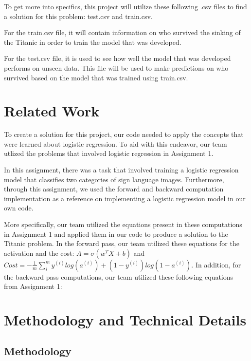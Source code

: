 \documentclass{IEEE}
\begin{document}
To get more into specifics, this project will utilize these following .csv files to find a solution for this problem: test.csv and train.csv.


For the train.csv file, it will contain information on who survived the sinking of the Titanic in order to train the model that was developed.

For the test.csv file, it is used to see how well the model that was developed performs on unseen data. This file will be used to make predictions on who survived based on the model that was trained using train.csv.




\section{Related Work}

To create a solution for this project, our code needed to apply the concepts that were learned about logistic regression. To aid with this endeavor, our team utlized the problems that involved logistic regression in Assignment 1.

In this assignment, there was a task that involved training a logistic regression model that classifies two categories of sign language images. Furthermore, through this assignment, we used the forward and backward computation implementation as a reference on implementing a logistic regression model in our own code.

More specifically, our team utilized the equations present in these computations in Assignment 1 and applied them in our code to produce a solution to the Titanic problem. In the forward pass, our team utilized these equations for the activation and the cost: $A=\sigma (w^TX+b)$ and $Cost=-\frac{1}{m}\sum^m_i y^{(i)}log(a^{(i)})+(1-y^{(i)})log(1-a^{(i)})$. In addition, for the backward pass computations, our team utilized these following equations from Assignment 1:


\section{Methodology and Technical Details}

\subsection{Methodology}
\end{document}
